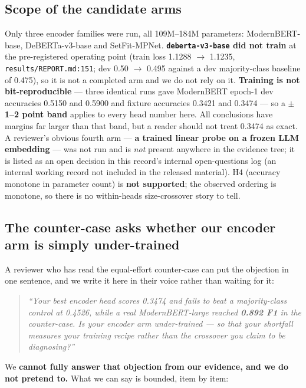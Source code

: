 \documentclass[11pt,a4paper]{article}
\begin{document}
\subsection{Scope of the candidate arms}

Only three encoder families were run, all 109M--184M parameters: ModernBERT-base, DeBERTa-v3-base and SetFit-MPNet. \textbf{\texttt{deberta-v3-base} did not train} at the pre-registered operating point (train loss 1.1288 $\to$ 1.1235, \texttt{results/REPORT.md:151}; dev 0.50 $\to$ 0.495 against a dev majority-class baseline of 0.475), so it is not a completed arm and we do not rely on it. \textbf{Training is not bit-reproducible} --- three identical runs gave ModernBERT epoch-1 dev accuracies 0.5150 and 0.5900 and fixture accuracies 0.3421 and 0.3474 --- so a \textbf{$\pm$1--2 point band} applies to every head number here. All conclusions have margins far larger than that band, but a reader should not treat 0.3474 as exact. A reviewer's obvious fourth arm --- \textbf{a trained linear probe on a frozen LLM embedding} --- was not run and is \emph{not} present anywhere in the evidence tree; it is listed as an open decision in this record's internal open-questions log (an internal working record not included in the released material). H4 (accuracy monotone in parameter count) is \textbf{not supported}; the observed ordering is monotone, so there is no within-heads size-crossover story to tell.

\subsection{The counter-case asks whether our encoder arm is simply under-trained}

A reviewer who has read the equal-effort counter-case can put the objection in one sentence, and we write it here in their voice rather than waiting for it:

\begin{quote}
\emph{``Your best encoder head scores 0.3474 and fails to beat a majority-class control at 0.4526, while a real ModernBERT-large reached \textbf{0.892 F1} in the counter-case. Is your encoder arm under-trained --- so that your shortfall measures your training recipe rather than the crossover you claim to be diagnosing?''}
\end{quote}

We \textbf{cannot fully answer that objection from our evidence, and we do not pretend to.} What we can say is bounded, item by item:
\end{document}
